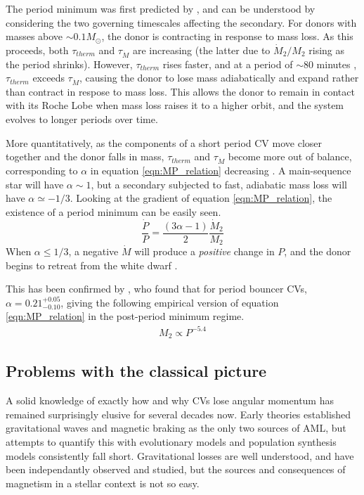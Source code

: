 The period minimum was first predicted by \citet{rappaport1982}, and can be understood by considering the two governing timescales affecting the secondary. 
For donors with masses above $\sim0.1 M_{\odot}$, the donor is contracting in response to mass loss. 
As this proceeds, both $\tau_{therm}$ and $\tau_{\dot M}$ are increasing (the latter due to $\dot M_2 / M_2$ rising as the period shrinks). However, $\tau_{therm}$ rises faster, and at a period of $\sim80$ minutes \citep{ritter1998, McAllister2019}, $\tau_{therm}$ exceeds $\tau_{\dot M}$, causing the donor to lose mass adiabatically and expand rather than contract in respose to mass loss.
This allows the donor to remain in contact with its Roche Lobe when mass loss raises it to a higher orbit, and the system evolves to longer periods over time.

More quantitatively, as the components of a short period CV move closer together and the donor falls in mass, $\tau_{therm}$ and $\tau_{\dot M}$ become more out of balance, corresponding to $\alpha$ in equation \ref{eqn:MP_relation} decreasing \citep{Knigge2011b}. A main-sequence star will have $\alpha \sim 1$, but a secondary subjected to fast, adiabatic mass loss will have $\alpha \simeq -1/3$. Looking at the gradient of equation \ref{eqn:MP_relation}, the existence of a period minimum can be easily seen.
\begin{equation}
    \frac{\dot P}{P} = \frac{(3\alpha - 1)}{2} \frac{\dot M_2}{M_2}
\end{equation}
When $\alpha \le 1/3$, a negative $\dot M$ will produce a \textit{positive} change in $P$, and the donor begins to retreat from the white dwarf \citep{rezzolla2001}. 

This has been confirmed by \citet{knigge11}, who found that for period bouncer CVs, $\alpha = 0.21^{+0.05}_{-0.10}$, giving the following empirical version of equation \ref{eqn:MP_relation} in the post-period minimum regime.
\begin{align}
    M_2 \propto P^{-5.4}
\end{align}


\subsection{Problems with the classical picture}
\label{sect:introduction:modern AML}

A solid knowledge of exactly how and why CVs lose angular momentum has remained surprisingly elusive for several decades now. Early theories established gravitational waves and magnetic braking as the only two sources of AML, but attempts to quantify this with evolutionary models and population synthesis models consistently fall short. Gravitational losses are well understood, and have been independantly observed and studied, but the sources and consequences of magnetism in a stellar context is not so easy. 

